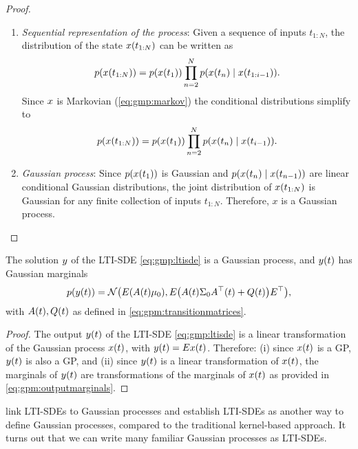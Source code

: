 \documentclass{mimosis}
\begin{document}
\begin{proof}
\begin{enumerate}[nosep]
\item \emph{Sequential representation of the process}:
Given a sequence of inputs \(t_{1:N}\), the distribution of the state \(x(t_{1:N})\) can be written as
\begin{equation}
\p(\st(t_{1:N})) = \p(\st(t_1)) \prod_{\idxt=2}^N \p(\st(t_\idxt) \mid \st(t_{1:i-1})).
\end{equation}
Since \(x\) is Markovian
(\cref{eq:gmp:markov})
the conditional distributions simplify to
\begin{equation}
\label{eq:gpm:proof:sequentialdistribution}
\p(\st(t_{1:N})) = \p(\st(t_1)) \prod_{\idxt=2}^N \p(\st(t_\idxt) \mid \st(t_{i-1})).
\end{equation}

\item \emph{Gaussian process}:
Since \(\p(\st(t_1))\) is Gaussian and \(\p(\st(t_\idxt) \mid \st(t_{\idxt-1}))\) are linear conditional Gaussian distributions, the joint distribution of \(x(t_{1:N})\) is Gaussian for any finite collection of inputs \(t_{1:N}\).
Therefore, \(x\) is a Gaussian process.
\end{enumerate}
\end{proof}

\begin{corollary}
The solution \(y\) of the LTI-SDE \cref{eq:gmp:ltisde}
is a Gaussian process,
and \(y(t)\) has Gaussian marginals
\begin{equation}
\label{eq:gpm:outputmarginals}
  \p(\val(t)) = \N( \outA \left(\transA(t) \mu_0 \right), \outA \left(\transA(t) \Sigma_0 \transA^\T(t) + \transC(t) \right) \outA^\T ),
\end{equation}
with \(A(t), Q(t)\) as defined in \cref{eq:gpm:transitionmatrices}.
\label{prop:lti-output-gp}
\end{corollary}
\begin{proof}
The output \(y(t)\) of the LTI-SDE \cref{eq:gmp:ltisde} is a linear transformation of the Gaussian process \(x(t)\), with \(y(t) = E x(t)\).
Therefore:
(i) since \(x(t)\) is a GP, \(y(t)\) is also a GP,
and (ii) since \(y(t)\) is a linear transformation of \(x(t)\), the marginals of \(y(t)\) are transformations of the marginals of \(x(t)\) as provided in \cref{eq:gpm:outputmarginals}.
\end{proof}

 link LTI-SDEs to Gaussian processes and establish LTI-SDEs as another way to define Gaussian processes, compared to the traditional kernel-based approach.
It turns out that we can write many familiar Gaussian processes as LTI-SDEs.
\end{document}
